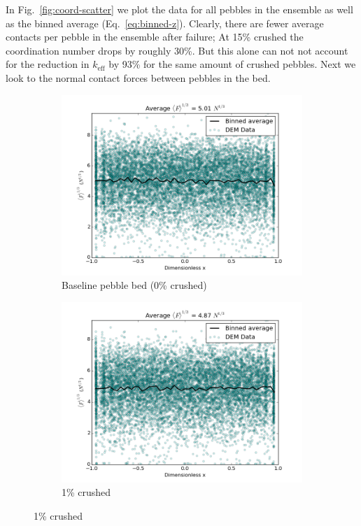In Fig.~\ref{fig:coord-scatter} we plot the data for all pebbles in the ensemble as well as the binned average (Eq.~\ref{eq:binned-z}). Clearly, there are fewer average contacts per pebble in the ensemble after failure; At 15\% crushed the coordination number drops by roughly 30\%. But this alone can not not account for the reduction in $k_\text{eff}$ by 93\% for the same amount of crushed pebbles. Next we look to the normal contact forces between pebbles in the bed.


\begin{figure}[!ht]
	\centering
	\begin{subfigure}[b]{0.4\textwidth}
		\centering
		\includegraphics[width=\textwidth]{chapters/figures/heating_dte-02/0/dump/force-profile.png}
		\caption{Baseline pebble bed (0\% crushed)}
	\end{subfigure}
	\begin{subfigure}[b]{0.4\textwidth}
		\centering
		\includegraphics[width=\textwidth]{chapters/figures/heating_dte-02/1/dump/force-profile.png}
		\caption{1\% crushed}
	\end{subfigure}
	

\end{figure}
